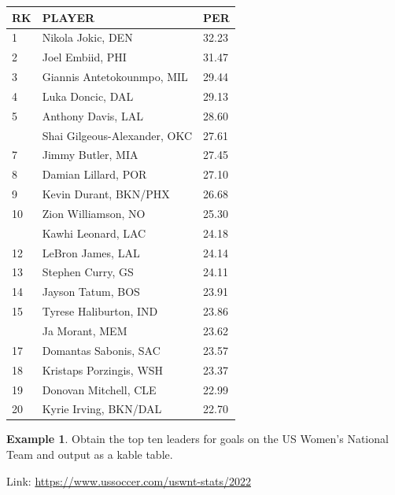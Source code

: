 \documentclass[
  11pt,
]{book}
\newenvironment{Shaded}{\begin{snugshade}}{\end{snugshade}}
\newcommand{\DecValTok}[1]{\textcolor[rgb]{0.00,0.00,0.81}{#1}}
\newcommand{\FunctionTok}[1]{\textcolor[rgb]{0.00,0.00,0.00}{#1}}
\newcommand{\NormalTok}[1]{#1}
\newcommand{\OtherTok}[1]{\textcolor[rgb]{0.56,0.35,0.01}{#1}}
\newcommand{\SpecialCharTok}[1]{\textcolor[rgb]{0.00,0.00,0.00}{#1}}
\newcommand{\StringTok}[1]{\textcolor[rgb]{0.31,0.60,0.02}{#1}}
\theoremstyle{definition}
\theoremstyle{definition}
\newtheorem{example}{Example}[chapter]
\theoremstyle{definition}
\theoremstyle{definition}
\theoremstyle{remark}
\begin{document}
\begin{tabular}{lll}
\toprule
RK & PLAYER & PER\\
\midrule
1 & Nikola Jokic, DEN & 32.23\\
2 & Joel Embiid, PHI & 31.47\\
3 & Giannis Antetokounmpo, MIL & 29.44\\
4 & Luka Doncic, DAL & 29.13\\
5 & Anthony Davis, LAL & 28.60\\
\addlinespace
6 & Shai Gilgeous-Alexander, OKC & 27.61\\
7 & Jimmy Butler, MIA & 27.45\\
8 & Damian Lillard, POR & 27.10\\
9 & Kevin Durant, BKN/PHX & 26.68\\
10 & Zion Williamson, NO & 25.30\\
\addlinespace
11 & Kawhi Leonard, LAC & 24.18\\
12 & LeBron James, LAL & 24.14\\
13 & Stephen Curry, GS & 24.11\\
14 & Jayson Tatum, BOS & 23.91\\
15 & Tyrese Haliburton, IND & 23.86\\
\addlinespace
16 & Ja Morant, MEM & 23.62\\
17 & Domantas Sabonis, SAC & 23.57\\
18 & Kristaps Porzingis, WSH & 23.37\\
19 & Donovan Mitchell, CLE & 22.99\\
20 & Kyrie Irving, BKN/DAL & 22.70\\
\bottomrule
\end{tabular}

\newpage

\begin{example}
Obtain the top ten leaders for goals on the US Women's National Team and output as a kable table.

Link: \url{https://www.ussoccer.com/uswnt-stats/2022}
\end{example}

\begin{Shaded}
\end{Shaded}
\end{document}
